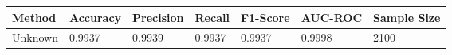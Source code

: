 \begin{tabular}{lllllll}
\toprule
Method & Accuracy & Precision & Recall & F1-Score & AUC-ROC & Sample Size \\
\midrule
Unknown & 0.9937 & 0.9939 & 0.9937 & 0.9937 & 0.9998 & 2100 \\
\bottomrule
\end{tabular}
